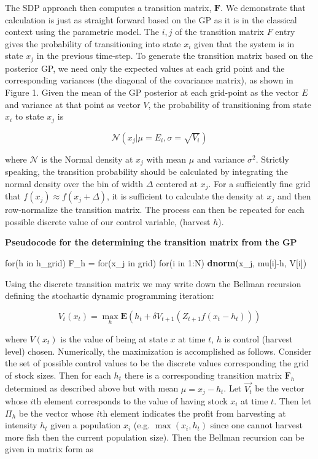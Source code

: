 \documentclass[author-year, review]{elsarticle} %
\newenvironment{Shaded}{}{}
\newcommand{\KeywordTok}[1]{\textcolor[rgb]{0.00,0.44,0.13}{\textbf{{#1}}}}
\newcommand{\DecValTok}[1]{\textcolor[rgb]{0.25,0.63,0.44}{{#1}}}
\newcommand{\StringTok}[1]{\textcolor[rgb]{0.25,0.44,0.63}{{#1}}}
\newcommand{\NormalTok}[1]{{#1}}
\begin{document}
The SDP approach then computes a transition matrix, $\mathbf{F}$. We
demonstrate that calculation is just as straight forward based on the GP
as it is in the classical context using the parametric model. The
${i,j}$ of the transition matrix $F$ entry gives the probability of
transitioning into state $x_i$ given that the system is in state $x_j$
in the previous time-step. To generate the transition matrix based on
the posterior GP, we need only the expected values at each grid point
and the corresponding variances (the diagonal of the covariance matrix),
as shown in Figure 1. Given the mean of the GP posterior at each
grid-point as the vector $E$ and variance at that point as vector $V$,
the probability of transitioning from state $x_i$ to state $x_j$ is

\[\mathcal{N}\left(x_j \vert  \mu = E_i, \sigma = \sqrt{V_i}\right)\]

where $\mathcal{N}$ is the Normal density at $x_j$ with mean $\mu$ and
variance $\sigma^2$. Strictly speaking, the transition probability
should be calculated by integrating the normal density over the bin of
width $\Delta$ centered at $x_j$. For a sufficiently fine grid that
$f(x_j) \approx f(x_j + \Delta)$, it is sufficient to calculate the
density at $x_j$ and then row-normalize the transition matrix. The
process can then be repeated for each possible discrete value of our
control variable, (harvest $h$).

\textbf{Pseudocode for the determining the transition matrix from the
GP}

\begin{Shaded}
\begin{Highlighting}[]
\NormalTok{for(h in h_grid)}
  \NormalTok{F_h =}\StringTok{ }\NormalTok{for(x_j in grid)}
          \NormalTok{for(i in }\DecValTok{1}\NormalTok{:N) }
            \KeywordTok{dnorm}\NormalTok{(x_j, mu[i]-h, V[i])}
\end{Highlighting}
\end{Shaded}

Using the discrete transition matrix we may write down the Bellman
recursion defining the stochastic dynamic programming iteration:

\begin{equation}
V_t(x_t) = \max_h \mathbf{E} \left( h_t + \delta V_{t+1}( Z_{t+1} f(x_t - h_t)) \right)
\end{equation}

where $V(x_t)$ is the value of being at state $x$ at time $t$, $h$ is
control (harvest level) chosen. Numerically, the maximization is
accomplished as follows. Consider the set of possible control values to
be the discrete values corresponding the grid of stock sizes. Then for
each $h_t$ there is a corresponding transition matrix $\mathbf{F}_h$
determined as described above but with mean $\mu = x_j - h_t$. Let
$\vec{V_t}$ be the vector whose $i$th element corresponds to the value
of having stock $x_i$ at time $t$. Then let $\Pi_h$ be the vector whose
$i$th element indicates the profit from harvesting at intensity $h_t$
given a population $x_i$ (e.g. $\max(x_i, h_t)$ since one cannot harvest
more fish then the current population size). Then the Bellman recursion
can be given in matrix form as
\end{document}
